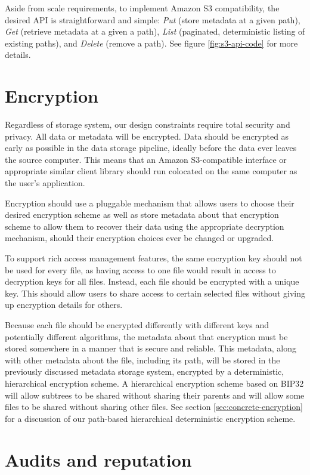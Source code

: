 \documentclass[8pt,fleqn,openany]{book}
\begin{document}
Aside from scale requirements, to implement Amazon S3 compatibility,
the desired API is straightforward and
simple: {\em Put} (store metadata at a given path), {\em Get} (retrieve metadata at a
given a path),
{\em List} (paginated, deterministic listing of existing paths), and {\em Delete}
(remove a path). See figure \ref{fig:s3-api-code} for more details.

\section{Encryption}

Regardless of storage system, our design constraints require total security
and privacy. All data or metadata will be encrypted.
Data should be encrypted as early as possible in the data storage pipeline,
ideally before the data ever leaves the source computer. This means that an
Amazon S3-compatible interface or appropriate similar client library should run
colocated on the same computer as the user's application.

Encryption should use a pluggable mechanism that allows users to choose their
desired encryption scheme as well as store metadata about that encryption
scheme to allow them to recover their data using the appropriate decryption
mechanism, should their encryption choices ever be changed or upgraded.

To support rich access management features, the same encryption key should not
be used for every file, as having access to one file would result in access
to decryption keys for all files. Instead, each file should be encrypted with
a unique key. This should allow users to share access to certain selected files
without giving up encryption details for others.

Because each file should be encrypted differently with different keys and
potentially different algorithms, the metadata about that encryption must
be stored somewhere in a manner that is secure and reliable. This metadata,
along with other metadata about the file, including its path, will
be stored in the previously discussed metadata storage system, encrypted
by a deterministic, hierarchical encryption scheme.
A hierarchical encryption scheme based on
BIP32 \cite{bip32} will allow subtrees to be shared without sharing their
parents and will allow some files to be shared without sharing other files.
See section \ref{sec:concrete-encryption} for a discussion of our path-based
hierarchical deterministic encryption scheme.

\section{Audits and reputation}\label{sec:framework-audits}
\end{document}
